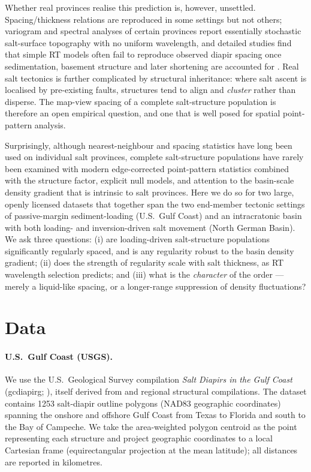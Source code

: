 \documentclass[11pt]{article}
\begin{document}
Whether real provinces realise this prediction is, however, unsettled. Spacing/thickness relations are
reproduced in some settings but not others; variogram and spectral analyses of certain provinces report
essentially stochastic salt-surface topography with no uniform wavelength, and detailed studies find that
simple RT models often fail to reproduce observed diapir spacing once sedimentation, basement structure and
later shortening are accounted for \citep{jackson2017}. Real salt tectonics is further complicated by
structural inheritance: where salt ascent is localised by pre-existing faults, structures tend to align and
\emph{cluster} rather than disperse. The map-view spacing of a complete salt-structure population is
therefore an open empirical question, and one that is well posed for spatial point-pattern analysis.

Surprisingly, although nearest-neighbour and spacing statistics have long been used on individual salt
provinces, complete salt-structure populations have rarely been examined with modern edge-corrected
point-pattern statistics combined with the structure factor, explicit null models, and attention to the
basin-scale density gradient that is intrinsic to salt provinces. Here we do so for two large, openly
licensed datasets that together span the two end-member tectonic settings of passive-margin
sediment-loading (U.S.\ Gulf Coast) and an intracratonic basin with both loading- and inversion-driven salt
movement (North German Basin). We ask three questions: (i) are loading-driven salt-structure populations
significantly regularly spaced, and is any regularity robust to the basin density gradient; (ii) does the
strength of regularity scale with salt thickness, as RT wavelength selection predicts; and (iii) what is
the \emph{character} of the order --- merely a liquid-like spacing, or a longer-range suppression of density
fluctuations?

\section{Data}
\paragraph{U.S.\ Gulf Coast (USGS).}
We use the U.S.\ Geological Survey compilation \emph{Salt Diapirs in the Gulf Coast} (gcdiapirg;
\citealp{usgsgc}), itself derived from \citet{martin1980} and regional structural compilations. The dataset
contains 1253 salt-diapir outline polygons (NAD83 geographic coordinates) spanning the onshore and offshore
Gulf Coast from Texas to Florida and south to the Bay of Campeche. We take the area-weighted polygon
centroid as the point representing each structure and project geographic coordinates to a local Cartesian
frame (equirectangular projection at the mean latitude); all distances are reported in kilometres.
\end{document}
